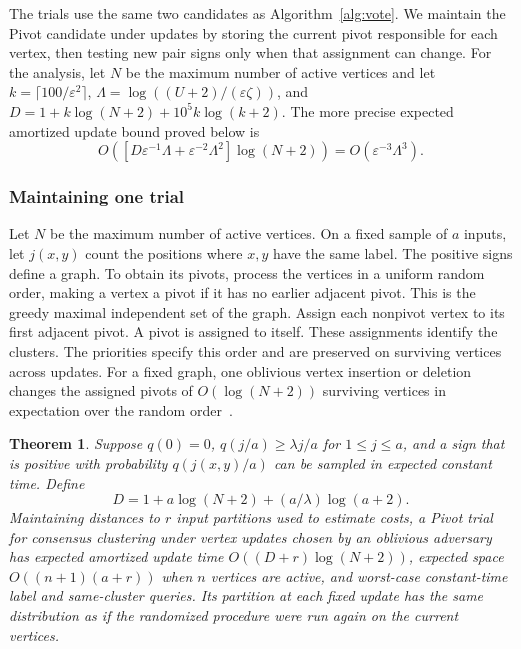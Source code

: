 \documentclass[11pt]{article}
\newtheorem{theorem}{Theorem}[section]
\begin{document}
The trials use the same two candidates as Algorithm~\ref{alg:vote}.
We maintain the Pivot candidate under updates by storing the current
pivot responsible for each vertex, then testing new pair signs only
when that assignment can change. For the analysis, let $N$ be the
maximum number of active vertices and let
$k=\lceil100/\varepsilon^2\rceil$,
$\Lambda=\log((U+2)/(\varepsilon\zeta))$, and
$D=1+k\log(N+2)+10^5k\log(k+2)$.
The more precise expected amortized update bound proved below is
\begin{equation}
 O\!\left([D\varepsilon^{-1}\Lambda+\varepsilon^{-2}\Lambda^2]
             \log(N+2)\right)
 =O(\varepsilon^{-3}\Lambda^3).
 \label{fastnew:time}
\end{equation}
\subsubsection{Maintaining one trial}
\label{defer:section}

Let $N$ be the maximum number of active vertices. On a fixed sample of
$a$ inputs, let $j(x,y)$ count the positions where $x,y$ have the same
label. The positive signs define a graph. To obtain its pivots,
process the vertices in a uniform random order, making a vertex a pivot
if it has no earlier adjacent pivot. This is the greedy maximal
independent set of the graph. Assign each nonpivot vertex to its first adjacent pivot. A pivot is
assigned to itself. These assignments identify the clusters. The priorities specify this
order and are preserved on surviving
vertices across updates. For a fixed graph, one oblivious vertex insertion or deletion changes
the assigned pivots of $O(\log(N+2))$ surviving vertices in expectation over
the random order~\cite[Theorem~3]{BDHSS2019}.

\begin{theorem}\label{defer:maintenance}
Suppose $q(0)=0$, $q(j/a)\ge\lambda j/a$ for $1\le j\le a$, and a
sign that is positive with probability $q(j(x,y)/a)$ can be sampled in
expected constant time. Define
\[
 D=1+a\log(N+2)+(a/\lambda)\log(a+2).
\]
Maintaining distances to $r$ input partitions used to estimate costs, a Pivot trial for
consensus clustering under vertex updates chosen by an oblivious adversary has expected amortized update time
$O((D+r)\log(N+2))$, expected space $O((n+1)(a+r))$ when $n$ vertices are active, and worst-case constant-time label and same-cluster queries.
Its partition at each fixed update has the same distribution as if
the randomized procedure were run again on the current vertices.
\end{theorem}
\end{document}
